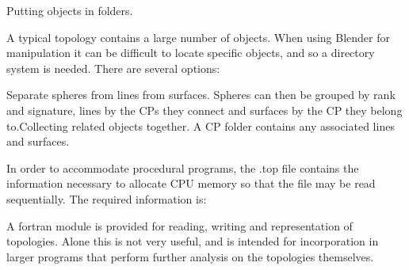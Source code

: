 \documentclass{tufte-book}
\begin{document}
Putting objects in folders.

A typical topology contains a large number of objects. When using Blender for manipulation it can be difficult to locate specific objects, and so a directory system is needed. There are several options:

Separate spheres from lines from surfaces. Spheres can then be grouped by rank and signature, lines by the CPs they connect and surfaces by the CP they belong to.Collecting related objects together. A CP folder contains any associated lines and surfaces.

In order to accommodate procedural programs, the .top file contains the information necessary to allocate CPU memory so that the file may be read sequentially. The required information is:

A fortran module is provided for reading, writing and representation of topologies. Alone this is not very useful, and is intended for incorporation in larger programs that perform further analysis on the topologies themselves.
\end{document}
